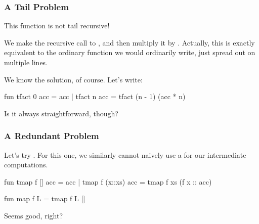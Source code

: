 \documentclass[aspectratio=169, handout]{beamer}
\begin{document}
\begin{frame}[fragile]
  \frametitle{A Tail Problem}

  This function is not tail recursive!

  \pause
  \vspace{\fill}

  We make the recursive call to , and then multiply it by 
  . Actually, this is exactly equivalent to the ordinary 
  function we would ordinarily write, just spread out on multiple lines.

  \pause
  \vspace{\fill}

  We know the solution, of course. Let's write:
  \begin{codeblock}
    fun tfact 0 acc = acc 
      | tfact n acc = tfact (n - 1) (acc * n)
  \end{codeblock}

  \pause
  \vspace{\fill}

  Is it always straightforward, though?
\end{frame}

\begin{frame}[fragile]
  \frametitle{A Redundant Problem}

  Let's try . For this one, we similarly cannot
  naively use a  for our intermediate computations.
  
  \pause
  \vspace{\fill}

  \begin{codeblock}
    fun tmap f [] acc = acc
      | tmap f (x::xs) acc = tmap f xs (f x :: acc) 

    fun map f L = tmap f L []
  \end{codeblock}

  Seems good, right?

  \pause
  \vspace{\fill}

\end{frame}
\end{document}

